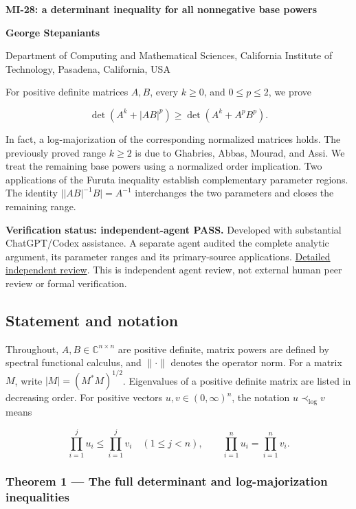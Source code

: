 \documentclass[10pt,a4paper]{article}
\begin{document}
{\raggedright\Large\bfseries MI-28: a determinant inequality for all
nonnegative base powers\par}
\vspace{0.4em}
{\normalsize\bfseries George Stepaniants\par}
{\small Department of Computing and Mathematical Sciences, California
Institute of Technology, Pasadena, California, USA\par}
\vspace{0.6em}
\pagestyle{plain}

For positive definite matrices \(A,B\), every \(k\ge0\), and
\(0\le p\le2\), we prove

\[
\det(A^k+|AB|^p)\ge\det(A^k+A^pB^p).
\]

In fact, a log-majorization of the corresponding normalized matrices
holds. The previously proved range \(k\ge2\) is due to Ghabries, Abbas,
Mourad, and Assi. We treat the remaining base powers using a normalized
order implication. Two applications of the Furuta inequality establish
complementary parameter regions. The identity
\(\lvert |AB|^{-1}B\rvert=A^{-1}\) interchanges the two parameters and
closes the remaining range.

\textbf{Verification status: independent-agent PASS.} Developed with
substantial ChatGPT/Codex assistance. A separate agent audited the
complete analytic argument, its parameter ranges and its primary-source
applications.
\href{https://github.com/ajt60gaibb/OpenProblemsInNLA/blob/main/references/stepaniants-mi28-2026-09-11/verification/reviews/MI-28-review.md}{Detailed
independent review}. This is independent agent review, not external
human peer review or formal verification.

\subsection{Statement and notation}\label{statement-and-notation}

Throughout, \(A,B\in\mathbb C^{n\times n}\) are positive definite,
matrix powers are defined by spectral functional calculus, and
\(\|\cdot\|\) denotes the operator norm. For a matrix \(M\), write
\(|M|=(M^*M)^{1/2}\). Eigenvalues of a positive definite matrix are
listed in decreasing order. For positive vectors \(u,v\in(0,\infty)^n\),
the notation \(u\prec_{\log}v\) means

\[
\prod_{i=1}^j u_i\le\prod_{i=1}^j v_i\quad(1\le j<n),
\qquad
\prod_{i=1}^n u_i=\prod_{i=1}^n v_i.
\]

\subsubsection{Theorem 1 --- The full determinant and log-majorization
inequalities}\label{theorem-1-the-full-determinant-and-log-majorization-inequalities}
\end{document}
